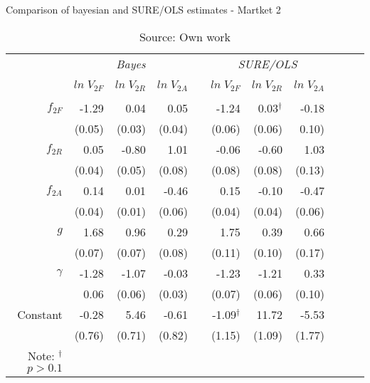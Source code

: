 \begin{table} [H]
\caption{Comparison of bayesian and SURE/OLS estimates - Martket 2}
\label{tbl:mkt2_T}
\centering
\begin{tabular}{rrrrrrrrrrr}
  \toprule 
 & \multicolumn{3}{c}{\textit{Bayes}} && \multicolumn{3}{c}{\textit{SURE/OLS}} \\ 
\cline{2-4} \cline{6-8} 
\\[-1.8ex] & $ln \; V_{2F}$ & $ln \; V_{2R}$ & $ln \; V_{2A}$ & & $ln \; V_{2F}$ & $ln \; V_{2R}$ & $ln \; V_{2A}$ \\ 
\hline \\[-1.8ex] 

  $f_{2F}$ & -1.29  & 0.04   & 0.05 & & -1.24 & 0.03$^{\dagger}$ & \cellcolor{gray!25}-0.18\\
  		     & (0.05) & (0.03) & (0.04) & & (0.06) & (0.06) & 0.10)\\ [0.2cm]
  $f_{2R}$ & 0.05   & -0.80  & 1.01 & &\cellcolor{gray!25}-0.06 & -0.60 & 1.03\\
  			   & (0.04) & (0.05) & (0.08) & & (0.08) & (0.08) & (0.13)\\ [0.2cm]
  $f_{2A}$ & 0.14   & 0.01   & -0.46 & &0.15 & \cellcolor{gray!25}-0.10 & -0.47 \\
           & (0.04) & (0.01) & (0.06) & &(0.04) & (0.04) & (0.06)\\ [0.2cm]
  $g$      & 1.68   & 0.96   & 0.29  & &1.75 & 0.39 & 0.66\\
  		     & (0.07) & (0.07) & (0.08) & &(0.11) & (0.10) & (0.17)\\ [0.2cm]
  $\gamma$ & -1.28  & -1.07  & -0.03 & &-1.23 & -1.21 & \cellcolor{gray!25}0.33\\
  			   & 0.06   & (0.06) & (0.03) & &(0.07) & (0.06) & (0.10)\\ [0.2cm]
  Constant & -0.28  & 5.46   & -0.61 & &-1.09$^{\dagger}$ & 11.72 & -5.53\\
  			   & (0.76) & (0.71) & (0.82) & &(1.15) & (1.09) & (1.77)\\ [0.2cm]
\bottomrule
Note: $^{\dagger}$ $p>0.1$
\end{tabular}
\caption*{Source: Own work}
\end{table}



